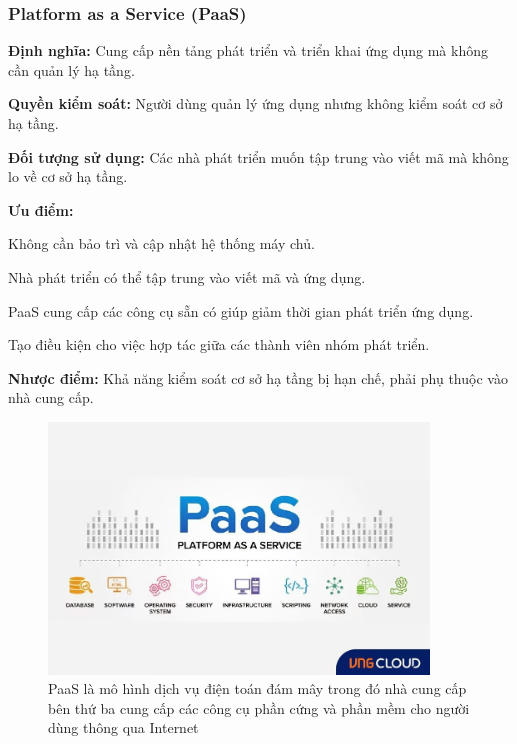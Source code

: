 \subsubsection{Platform as a Service (PaaS)}
\begin{myitem}
  \item \textbf{Định nghĩa:} Cung cấp nền tảng phát triển và triển khai ứng dụng mà không cần quản lý hạ tầng.

  \item \textbf{Quyền kiểm soát:} Người dùng quản lý ứng dụng nhưng không kiểm soát cơ sở hạ tầng.

  \item \textbf{Đối tượng sử dụng:} Các nhà phát triển muốn tập trung vào viết mã mà không lo về cơ sở hạ tầng.

  \item \textbf{Ưu điểm:}
    \begin{mysubitem}
      \item Không cần bảo trì và cập nhật hệ thống máy chủ.
      \item Nhà phát triển có thể tập trung vào viết mã và ứng dụng.
      \item PaaS cung cấp các công cụ sẵn có giúp giảm thời gian phát triển ứng dụng.
      \item Tạo điều kiện cho việc hợp tác giữa các thành viên nhóm phát triển.
    \end{mysubitem}

  \item \textbf{Nhược điểm:} Khả năng kiểm soát cơ sở hạ tầng bị hạn chế, phải phụ thuộc vào nhà cung cấp.
\end{myitem}

\begin{figure}[H] %
    \centering
    \includegraphics[width=0.9\textwidth]{Tong_quan_DTDM/PaaS.jpg}
    \caption{PaaS là mô hình dịch vụ điện toán đám mây trong đó nhà cung cấp bên
thứ ba cung cấp các công cụ phần cứng và phần mềm cho người dùng thông qua
Internet}
    \label{fig:cloud_intro}
\end{figure}

